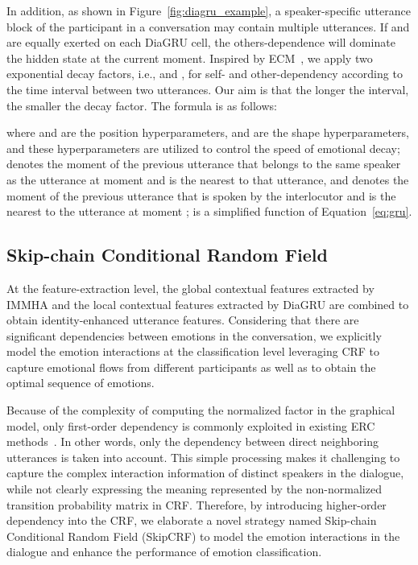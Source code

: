 \documentclass{SCIS2019}
\begin{document}
In addition, as shown in Figure~\ref{fig:diagru_example}, a speaker-specific utterance block of the participant in a conversation may contain multiple utterances. If  and  are equally exerted on each DiaGRU cell, the others-dependence will dominate the hidden state  at the current moment. Inspired by ECM~\cite{zhou2018emotional}, we apply two exponential decay factors, i.e.,  and , for self- and other-dependency according to the time interval between two utterances. Our aim is that the longer the interval, the smaller the decay factor. The formula is as follows:

where  and  are the position hyperparameters,  and  are the shape hyperparameters, and these hyperparameters are utilized to control the speed of emotional decay;  denotes the moment of the previous utterance that belongs to the same speaker as the utterance at moment  and is the nearest to that utterance, and  denotes the moment of the previous utterance that is spoken by the interlocutor and is the nearest to the utterance at moment ;  is a simplified function of Equation~\ref{eq:gru}.

\subsection{Skip-chain Conditional Random Field}
At the feature-extraction level, the global contextual features extracted by IMMHA and the local contextual features extracted by DiaGRU are combined to obtain identity-enhanced utterance features. Considering that there are significant dependencies between emotions in the conversation, we explicitly model the emotion interactions at the classification level leveraging CRF to capture emotional flows from different participants as well as to obtain the optimal sequence of emotions.

Because of the complexity of computing the normalized factor in the graphical model, only first-order dependency is commonly exploited in existing ERC methods~\cite{wang2020contextualized, song2022emotionflow}. In other words, only the dependency between direct neighboring utterances is taken into account. This simple processing makes it challenging to capture the complex interaction information of distinct speakers in the dialogue, while not clearly expressing the meaning represented by the non-normalized transition probability matrix in CRF. Therefore, by introducing higher-order dependency into the CRF, we elaborate a novel strategy named Skip-chain Conditional Random Field (SkipCRF) to model the emotion interactions in the dialogue and enhance the performance of emotion classification.
\end{document}
